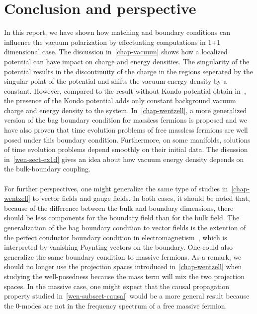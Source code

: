 \chapter{Conclusion and perspective}
In this report, we have shown how matching and boundary conditions can influence the vacuum polarization by effectuating computations in 1+1 dimensional case. 
The discussion in~\cref{chap-vacuum} shows how a localized  potential can have impact on charge and energy densities.
The singularity of the potential results in the discontinuity of the charge in the regions seperated by the singular point of the potential and shifts the vacuum energy density by a constant.
However, compared to the result without Kondo potential obtain in~\cite{Zahn2015}, the presence of the Kondo potential adds only constant background vacuum charge and energy density to the system. 
In~\cref{chap-wentzell}, a more generalized version of the bag boundary condition for massless fermions is proposed and we have also proven that time evolution problems of free massless fermions are well posed under this boundary condition.
Furthermore, on some manifolds, solutions of time evolution problems depend smoothly on their initial data.
The disussion in~\cref{wen-sect-ex1d} gives an idea about how vacuum energy density depends on the bulk-boundary coupling.
\\\\
For further perspectives, 
one might generalize the same type of studies in~\cref{chap-wentzell} to vector fields and gauge fields.
In both cases, it should be noted that, because of the difference between the bulk and boundary dimensions, 
there should be less components for the boundary field than for the bulk field.
The generalization of the bag boundary condition to vector fields is the extention of the perfect conductor boundary condition in electromagnetism~\cite{Stokes2015}, 
which is interpreted by vanishing Poynting vectors on the boundary.
One could also generalize the same boundary condition to massive fermions. 
As a remark, 
we should no longer use the projection spaces introduced in~\cref{chap-wentzell} when studying the well-posedness because the mass term will mix the two projection spaces.
In the massive case, one might expect that the causal propagation property studied in~\cref{wen-subsect-causal} would be a more general result because the 0-modes are not in the frequency spectrum of a free massive fermion. 




